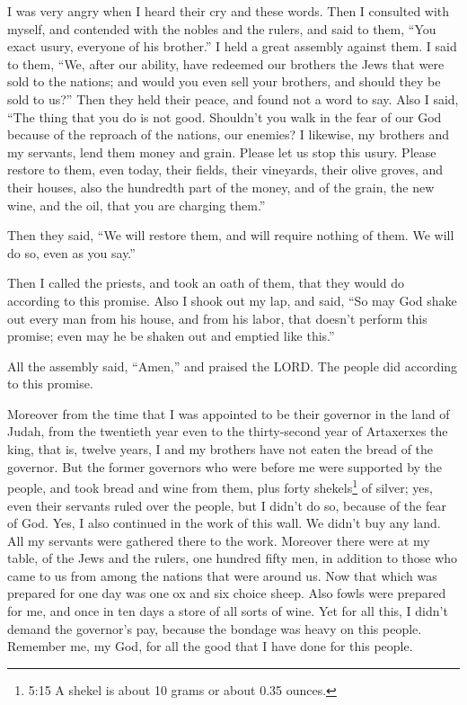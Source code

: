 \myverse{}I was very angry when I heard their cry and these words.
\myverse{}Then I consulted with myself, and contended with the nobles and the rulers,
and said to them, “You exact usury, everyone of his brother.” I held a great assembly against them.
\myverse{}I said to them, “We, after our ability, have redeemed our brothers the Jews
that were sold to the nations; and would you even sell your brothers, and should they be sold to us?”
Then they held their peace, and found not a word to say.
\myverse{}Also I said, “The thing that you do is not good. Shouldn’t you walk in the fear
of our God because of the reproach of the nations, our enemies?
\myverse{}I likewise, my brothers and my servants, lend them money and grain. Please
let us stop this usury.
\myverse{}Please restore to them, even today, their fields, their vineyards, their olive
groves, and their houses, also the hundredth part of the money, and of the grain, the new wine, and the
oil, that you are charging them.”

\myverse{}Then they said, “We will restore them, and will require nothing
of them. We will do so, even as you say.”

Then I called the priests, and took an oath of them, that they would do according to this
promise.
\myverse{}Also I shook out my lap, and said, “So may God shake out every man from his
house, and from his labor, that doesn’t perform this promise; even may he be shaken out and emptied like
this.”

All the assembly said, “Amen,” and praised the LORD. The people did according to this promise.

\myverse{}Moreover from the time that I was appointed to be their governor
in the land of Judah, from the twentieth year even to the thirty-second year of Artaxerxes the king, that
is, twelve years, I and my brothers have not eaten the bread of the governor.
\myverse{}But the former governors who were before me were supported by the people,
and took bread and wine from them, plus forty shekels\footnote{5:15 A shekel is about 10 grams or about 0.35 ounces.} of silver; yes, even their servants
ruled over the people, but I didn’t do so, because of the fear of God.
\myverse{}Yes, I also continued in the work of this wall. We didn’t buy any land. All
my servants were gathered there to the work.
\myverse{}Moreover there were at my table, of the Jews and the rulers, one hundred fifty
men, in addition to those who came to us from among the nations that were around us.
\myverse{}Now that which was prepared for one day was one ox and six choice sheep. Also
fowls were prepared for me, and once in ten days a store of all sorts of wine. Yet for all this, I didn’t
demand the governor’s pay, because the bondage was heavy on this people.
\myverse{}Remember me, my God, for all the good that I have done for this people.


